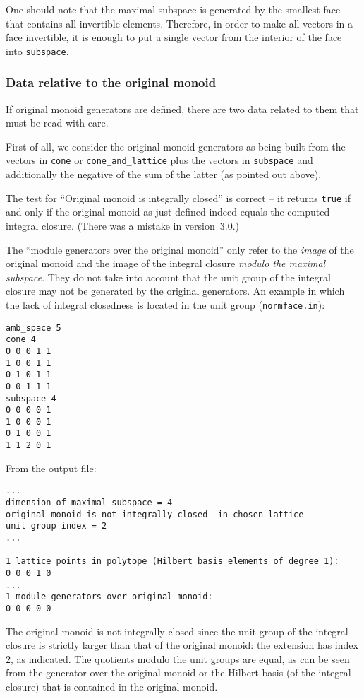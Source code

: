 \documentclass[12pt,a4paper]{scrartcl}
\theoremstyle{definition}
\begin{document}
One should note that the maximal subspace is generated by the smallest face that contains all invertible elements. Therefore, in order to make all vectors in a face invertible, it is enough to put a single vector from the interior of the face into \verb|subspace|.

\subsubsection{Data relative to the original monoid}

If original monoid generators are defined, there are two data related to them that must be read with care.

First of all, we consider the original monoid generators as being built from the vectors in \verb|cone| or \verb|cone_and_lattice| plus the vectors in \verb|subspace| and additionally the negative of the sum of the latter (as pointed out above).

The test for ``Original monoid is integrally closed'' is correct -- it returns \verb|true| if and only if the original monoid as just defined indeed equals the computed integral closure. (There was a mistake in version~3.0.)

The ``module generators over the original monoid'' only refer to the \emph{image} of the original monoid and the image of the integral closure \emph{modulo the maximal subspace}. They do not take into account that the unit group of the integral closure may not be generated by the original generators. An example in which the lack of integral closedness is located in the unit group (\verb|normface.in|):

\begin{Verbatim}
amb_space 5
cone 4
0 0 0 1 1
1 0 0 1 1
0 1 0 1 1
0 0 1 1 1
subspace 4
0 0 0 0 1
1 0 0 0 1
0 1 0 0 1
1 1 2 0 1
\end{Verbatim}

From the output file:

\begin{Verbatim}
...
dimension of maximal subspace = 4
original monoid is not integrally closed  in chosen lattice
unit group index = 2
...

1 lattice points in polytope (Hilbert basis elements of degree 1):
0 0 0 1 0
...
1 module generators over original monoid:
0 0 0 0 0
\end{Verbatim}
The original monoid is not integrally closed since the unit group of the integral closure is strictly larger than that of the original monoid: the extension has index $2$, as indicated. The quotients modulo the unit groups are equal, as can be seen from the generator over the original monoid or the Hilbert basis (of the integral closure) that is contained in the original monoid.
\end{document}
